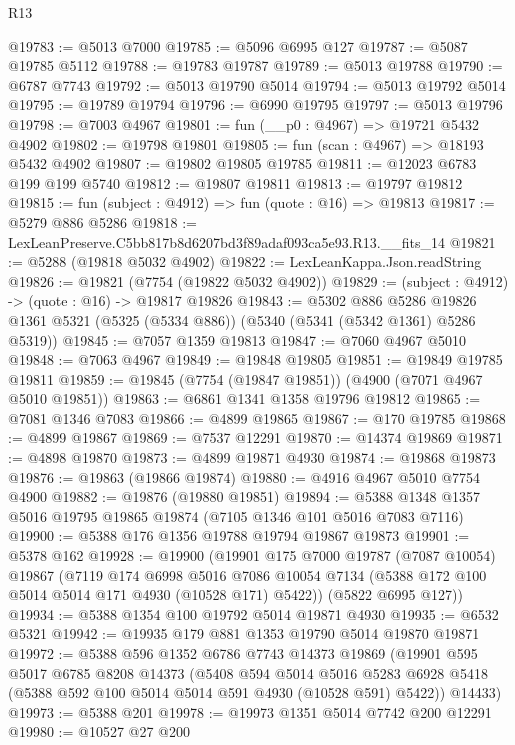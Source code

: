 \begin{lexlean}{R13}
\begin{coremodule}
@19783 := @5013 @7000
@19785 := @5096 @6995 @127
@19787 := @5087 @19785 @5112
@19788 := @19783 @19787
@19789 := @5013 @19788
@19790 := @6787 @7743
@19792 := @5013 @19790 @5014
@19794 := @5013 @19792 @5014
@19795 := @19789 @19794
@19796 := @6990 @19795
@19797 := @5013 @19796
@19798 := @7003 @4967
@19801 := fun (__p0 : @4967) => @19721 @5432 @4902
@19802 := @19798 @19801
@19805 := fun (scan : @4967) => @18193 @5432 @4902
@19807 := @19802 @19805 @19785
@19811 := @12023 @6783 @199 @199 @5740
@19812 := @19807 @19811
@19813 := @19797 @19812
@19815 := fun (subject : @4912) => fun (quote : @16) => @19813
@19817 := @5279 @886 @5286
@19818 := LexLeanPreserve.C5bb817b8d6207bd3f89adaf093ca5e93.R13.__fits_14
@19821 := @5288 (@19818 @5032 @4902)
@19822 := LexLeanKappa.Json.readString
@19826 := @19821 (@7754 (@19822 @5032 @4902))
@19829 := (subject : @4912) -> (quote : @16) -> @19817 @19826
@19843 := @5302
    @886
    @5286
    @19826
    @1361
    @5321
    (@5325 (@5334 @886))
    (@5340 (@5341 (@5342 @1361) @5286 @5319))
@19845 := @7057 @1359 @19813
@19847 := @7060 @4967 @5010
@19848 := @7063 @4967
@19849 := @19848 @19805
@19851 := @19849 @19785 @19811
@19859 := @19845 (@7754 (@19847 @19851)) (@4900 (@7071 @4967 @5010 @19851))
@19863 := @6861 @1341 @1358 @19796 @19812
@19865 := @7081 @1346 @7083
@19866 := @4899 @19865
@19867 := @170 @19785
@19868 := @4899 @19867
@19869 := @7537 @12291
@19870 := @14374 @19869
@19871 := @4898 @19870
@19873 := @4899 @19871 @4930
@19874 := @19868 @19873
@19876 := @19863 (@19866 @19874)
@19880 := @4916 @4967 @5010 @7754 @4900
@19882 := @19876 (@19880 @19851)
@19894 := @5388 @1348 @1357 @5016 @19795 @19865 @19874 (@7105 @1346 @101 @5016 @7083 @7116)
@19900 := @5388 @176 @1356 @19788 @19794 @19867 @19873
@19901 := @5378 @162
@19928 := @19900
    (@19901
      @175
      @7000
      @19787
      (@7087 @10054)
      @19867
      (@7119
        @174
        @6998
        @5016
        @7086
        @10054
        @7134
        (@5388 @172 @100 @5014 @5014 @171 @4930 (@10528 @171) @5422))
      (@5822 @6995 @127))
@19934 := @5388 @1354 @100 @19792 @5014 @19871 @4930
@19935 := @6532 @5321
@19942 := @19935 @179 @881 @1353 @19790 @5014 @19870 @19871
@19972 := @5388
    @596
    @1352
    @6786
    @7743
    @14373
    @19869
    (@19901
      @595
      @5017
      @6785
      @8208
      @14373
      (@5408
        @594
        @5014
        @5016
        @5283
        @6928
        @5418
        (@5388 @592 @100 @5014 @5014 @591 @4930 (@10528 @591) @5422))
      @14433)
@19973 := @5388 @201
@19978 := @19973 @1351 @5014 @7742 @200 @12291
@19980 := @10527 @27 @200

\end{coremodule}
\end{lexlean}
